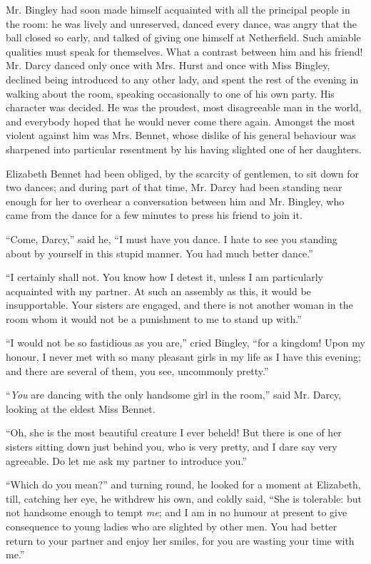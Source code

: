 Mr. Bingley had soon made himself acquainted with all the principal people in the room: he was lively and unreserved, danced every dance, was angry that the ball closed so early, and talked of giving one himself at Netherfield. Such amiable qualities must speak for themselves. What a contrast between him and his friend! Mr. Darcy danced only once with Mrs. Hurst and once with Miss Bingley, declined being introduced to any other lady, and spent the rest of the evening in walking about the room, speaking occasionally to one of his own party. His character was decided. He was the proudest, most disagreeable man in the world, and everybody hoped that he would never come there again. Amongst the most violent against him was Mrs. Bennet, whose dislike of his general behaviour was sharpened into particular resentment by his having slighted one of her daughters.

Elizabeth Bennet had been obliged, by the scarcity of gentlemen, to sit down for two dances; and during part of that time, Mr. Darcy had been standing near enough for her to overhear a conversation between him and Mr. Bingley, who came from the dance for a few minutes to press his friend to join it.

``Come, Darcy,'' said he, ``I must have you dance. I hate to see you standing about by yourself in this stupid manner. You had much better dance.''

``I certainly shall not. You know how I detest it, unless I am particularly acquainted with my partner. At such an assembly as this, it would be insupportable. Your sisters are engaged, and there is not another woman in the room whom it would not be a punishment to me to stand up with.''

``I would not be so fastidious as you are,'' cried Bingley, ``for a kingdom! Upon my honour, I never met with so many pleasant girls in my life as I have this evening; and there are several of them, you see, uncommonly pretty.''

``\textit{You} are dancing with the only handsome girl in the room,'' said Mr. Darcy, looking at the eldest Miss Bennet.

``Oh, she is the most beautiful creature I ever beheld! But there is one of her sisters sitting down just behind you, who is very pretty, and I dare say very agreeable. Do let me ask my partner to introduce you.''


``Which do you mean?'' and turning round, he looked for a moment at Elizabeth, till, catching her eye, he withdrew his own, and coldly said, ``She is tolerable: but not handsome enough to tempt \textit{me}; and I am in no humour at present to give consequence to young ladies who are slighted by other men. You had better return to your partner and enjoy her smiles, for you are wasting your time with me.''


